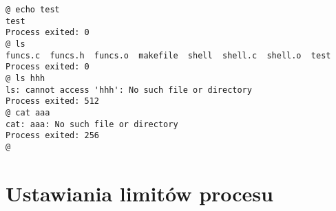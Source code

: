 \documentclass[a4paper,15pt]{article}
\begin{document}
\begin{lstlisting}[style=CStyle, label=some-code, caption=testowanie procres]
@ echo test
test
Process exited: 0
@ ls
funcs.c  funcs.h  funcs.o  makefile  shell  shell.c  shell.o  test
Process exited: 0
@ ls hhh
ls: cannot access 'hhh': No such file or directory
Process exited: 512
@ cat aaa
cat: aaa: No such file or directory
Process exited: 256
@ 
\end{lstlisting}

\section{Ustawiania limitów procesu}
\end{document}
